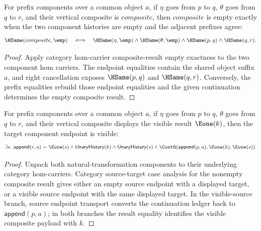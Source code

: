 \begin{theorem}
\label{thm:nattrans-prefix-component-vert-comp-result-empty-iff}
For prefix components over a common object $a$, if $\eta$ goes from $p$ to
$q$, $\theta$ goes from $q$ to $r$, and their vertical composite is
$composite$, then $composite$ is empty exactly when the two component histories
are empty and the adjacent prefixes agree:
$$
\HSame(composite,\emp)
\quad\Longleftrightarrow\quad
\HSame(\eta,\emp)\wedge\HSame(\theta,\emp)\wedge\HSame(p,q)\wedge\HSame(q,r).
$$
\end{theorem}
\begin{proof}
Apply category hom-carrier composite-result empty exactness to the two
component hom carriers. The endpoint equalities contain the shared object
suffix $a$, and right cancellation exposes $\HSame(p,q)$ and $\HSame(q,r)$.
Conversely, the prefix equalities rebuild those endpoint equalities and the
given continuation determines the empty composite result.
\end{proof}

\begin{theorem}
\label{thm:nattrans-prefix-component-vert-comp-nonempty-result-target-visible}
For prefix components over a common object $a$, if $\eta$ goes from $p$
to $q$, $\theta$ goes from $q$ to $r$, and their vertical composite
displays the visible result $\Eone(k)$, then the target component endpoint is
visible:
$$
\exists s.\ \mathsf{append}(r,a)=\Eone(s)\wedge
\mathsf{UnaryHistory}(k)\wedge\mathsf{UnaryHistory}(s)\wedge
\ContR(\mathsf{append}(p,a),\Eone(k),\Eone(s)).
$$
\end{theorem}
\begin{proof}
Unpack both natural-transformation components to their underlying category
hom-carriers. Category source-target case analysis for the nonempty composite
result gives either an empty source endpoint with a displayed target, or a
visible source endpoint with the same displayed target. In the visible-source
branch, source endpoint transport converts the continuation ledger back to
$\mathsf{append}(p,a)$; in both branches the result equality identifies the
visible composite payload with $k$.
\end{proof}

